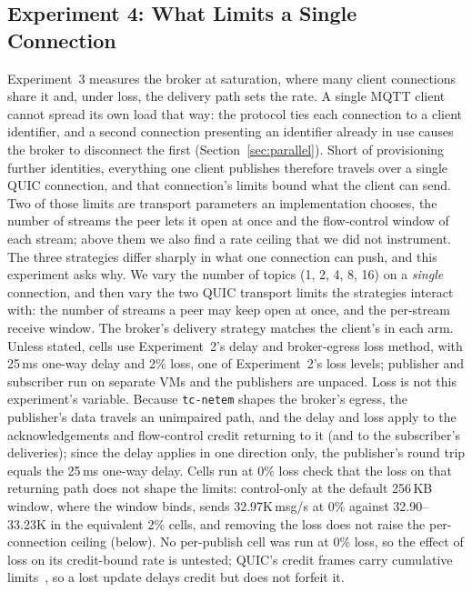 \documentclass[a4paper,fleqn]{cas-dc}
\begin{document}
\subsection{Experiment 4: What Limits a Single Connection}

Experiment~3 measures the broker at saturation, where many client connections share it and, under loss, the delivery path sets the rate. A single MQTT client cannot spread its own load that way: the protocol ties each connection to a client identifier, and a second connection presenting an identifier already in use causes the broker to disconnect the first (Section~\ref{sec:parallel}). Short of provisioning further identities, everything one client publishes therefore travels over a single QUIC connection, and that connection's limits bound what the client can send. Two of those limits are transport parameters an implementation chooses, the number of streams the peer lets it open at once and the flow-control window of each stream; above them we also find a rate ceiling that we did not instrument. The three strategies differ sharply in what one connection can push, and this experiment asks why. We vary the number of topics (1, 2, 4, 8, 16) on a \emph{single} connection, and then vary the two QUIC transport limits the strategies interact with: the number of streams a peer may keep open at once, and the per-stream receive window. The broker's delivery strategy matches the client's in each arm. Unless stated, cells use Experiment~2's delay and broker-egress loss method, with 25\,ms one-way delay and 2\% loss, one of Experiment~2's loss levels; publisher and subscriber run on separate VMs and the publishers are unpaced. Loss is not this experiment's variable. Because \texttt{tc-netem} shapes the broker's egress, the publisher's data travels an unimpaired path, and the delay and loss apply to the acknowledgements and flow-control credit returning to it (and to the subscriber's deliveries); since the delay applies in one direction only, the publisher's round trip equals the 25\,ms one-way delay. Cells run at 0\% loss check that the loss on that returning path does not shape the limits: control-only at the default 256\,KB window, where the window binds, sends 32.97K\,msg/s at 0\% against 32.90--33.23K in the equivalent 2\% cells, and removing the loss does not raise the per-connection ceiling (below). No per-publish cell was run at 0\% loss, so the effect of loss on its credit-bound rate is untested; QUIC's credit frames carry cumulative limits~\cite{rfc9000}, so a lost update delays credit but does not forfeit it.
\end{document}
